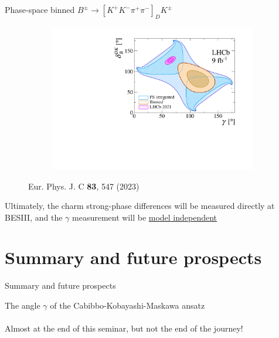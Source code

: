\documentclass[dvipsnames]{beamer}
\begin{document}
\begin{frame}{Phase-space binned $B^\pm\to[K^+K^-\pi^+\pi^-]_DK^\pm$}
\begin{figure}[htb]
\begin{subfigure}{0.5\textwidth}
      \includegraphics[width=1\textwidth]{Plots/gammacharm_lhcb_KKpipi_GLW_KKpipi_GGSZ_lhcb_2020_beauty_and_charm_g_d_dk.pdf}
    \end{subfigure}
    \vspace{-0.5cm}
    \caption*{\tiny Eur. Phys. J. C \textbf{83}, 547 (2023)}
  \end{figure}
  \vspace{-0.5cm}
  \begin{center}
    {\large Ultimately, the charm strong-phase differences will be measured directly at BESIII, and the $\gamma$ measurement will be \underline{model independent}}
  \end{center}
\end{frame}

\section{Summary and future prospects}
\begin{frame}{Summary and future prospects}
  \begin{center}
    {\huge The angle $\gamma$ of the Cabibbo-Kobayashi-Maskawa ansatz} \\~\\
    {\large Almost at the end of this seminar, but not the end of the journey!}
  \end{center}
\end{frame}
\end{document}
